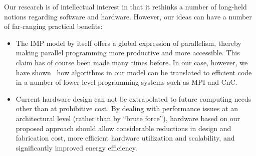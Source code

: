 Our research is of intellectual interest in that it rethinks a number
of long-held notions regarding software and hardware. However, our
ideas can have a number of far-ranging practical benefits:
\begin{itemize}
\item The \ac{IMP} model by itself offers a global expression of
  parallelism, thereby making parallel programming more productive and
  more accessible. This claim has of course been made many times
  before. In our case, however, we have
  shown~\cite{Eijkhout:hips2014} how algorithms in our
  model can be translated to efficient code in a number of lower level
  programming systems such as \ac{MPI} and \ac{CnC}.
\item Current hardware design can not be extrapolated to future
  computing needs other than at prohibitive cost.  By dealing with performance
  issues at an architectural level (rather than by ``brute force''), hardware based 
  on our proposed approach should allow considerable reductions in design and 
  fabrication cost, more efficient hardware utilization and scalability, and significantly
  improved energy efficiency.
\end{itemize}

